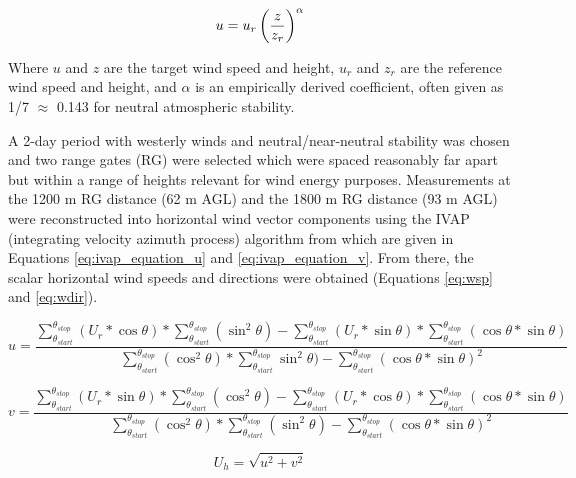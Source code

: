 \begin{equation}
    \centering
        u = u_{r} \left( \frac {z} {z_{r}} \right) ^ {\alpha}
    \label{eq:wind_power_law}
\end{equation}

Where $u$ and $z$ are the target wind speed and height, $u_r$ and $z_r$ are the reference wind speed and height, and $\alpha$ is an empirically derived coefficient, often given as 1/7 $\approx$ 0.143 for neutral atmospheric stability.

A 2-day period with westerly winds and neutral/near-neutral stability was chosen and two range gates (RG) were selected which were spaced reasonably far apart but within a range of heights relevant for wind energy purposes. Measurements at the 1200 m RG distance (62 m AGL) and the 1800 m RG distance (93 m AGL) were reconstructed into horizontal wind vector components using the IVAP (integrating velocity azimuth process) algorithm from \cite{liang_ivap_2007} which are given in Equations \ref{eq:ivap_equation_u} and \ref{eq:ivap_equation_v}. From there, the scalar horizontal wind speeds and directions were obtained (Equations \ref{eq:wsp} and \ref{eq:wdir}).

\begin{equation}
    u = \frac{\sum_{\theta_{start}}^{\theta_{stop}} (U_r*\cos \theta ) * \sum_{\theta_{start}}^{\theta_{stop}} (\sin^2 \theta )- \sum_{\theta_{start}}^{\theta_{stop}} (U_r*\sin \theta ) * \sum_{\theta_{start}}^{\theta_{stop}} (\cos \theta  * \sin \theta )}
    {\sum_{\theta_{start}}^{\theta_{stop}} (\cos^2 \theta )*\sum_{\theta_{start}}^{\theta_{stop}} \sin^2 \theta  ) - \sum_{\theta_{start}}^{\theta_{stop}} (\cos \theta  * \sin \theta )^2}
    \label{eq:ivap_equation_u}
\end{equation}

\begin{equation}
    v = \frac{\sum_{\theta_{start}}^{\theta_{stop}} (U_r*\sin \theta ) * \sum_{\theta_{start}}^{\theta_{stop}} (\cos^2 \theta )-\sum_{\theta_{start}}^{\theta_{stop}} (U_r*\cos \theta ) * \sum_{\theta_{start}}^{\theta_{stop}} (\cos \theta  * \sin \theta )}
    {\sum_{\theta_{start}}^{\theta_{stop}} (\cos^2 \theta )*\sum_{\theta_{start}}^{\theta_{stop}} (\sin^2 \theta ) - \sum_{\theta_{start}}^{\theta_{stop}} (\cos \theta  * \sin \theta )^2}
    \label{eq:ivap_equation_v}
\end{equation}

\begin{equation}
    U_h = \sqrt{u^2 + v^2}
    \label{eq:wsp}
\end{equation}

